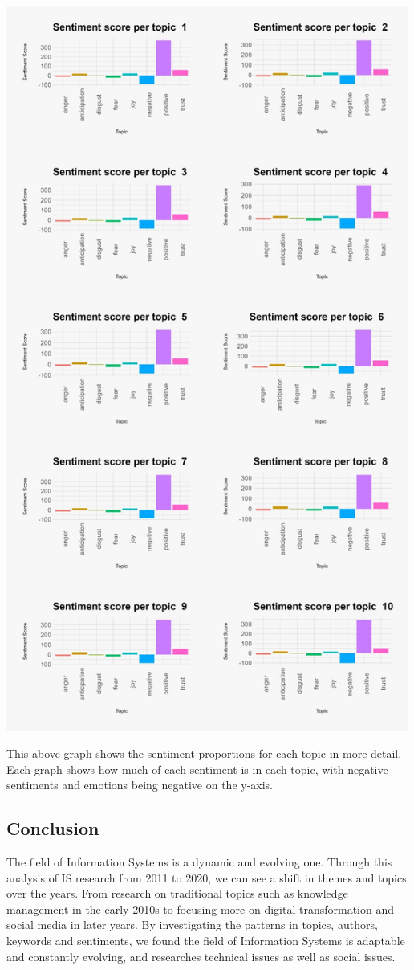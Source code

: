 \documentclass[
  letterpaper,
  DIV=11,
  numbers=noendperiod]{scrartcl}
\begin{document}
\includegraphics[width=5.20833in,height=\textheight]{images/SentimentScorePerTopic.jpg}

This above graph shows the sentiment proportions for each topic in more
detail. Each graph shows how much of each sentiment is in each topic,
with negative sentiments and emotions being negative on the y-axis.

\newpage{}

\hypertarget{conclusion}{%
\subsection{Conclusion}\label{conclusion}}

The field of Information Systems is a dynamic and evolving one. Through
this analysis of IS research from 2011 to 2020, we can see a shift in
themes and topics over the years. From research on traditional topics
such as knowledge management in the early 2010s to focusing more on
digital transformation and social media in later years. By investigating
the patterns in topics, authors, keywords and sentiments, we found the
field of Information Systems is adaptable and constantly evolving, and
researches technical issues as well as social issues.
\end{document}

